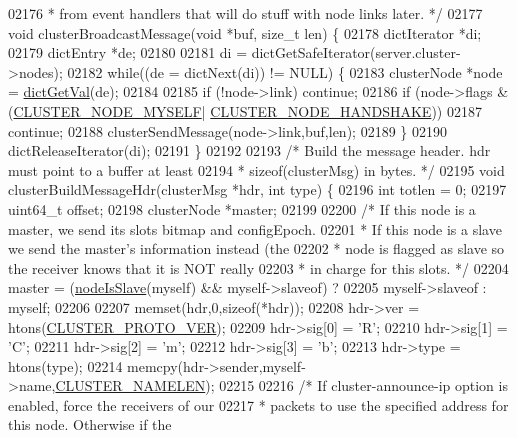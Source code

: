 \begin{DoxyCode}
{{{{{{{{{{{{{{{{{{{{{{{{{{{{{{{{{{{{{{02176 \textcolor{comment}{ * from event handlers that will do stuff with node links later. */}
02177 \textcolor{keywordtype}{void} clusterBroadcastMessage(\textcolor{keywordtype}{void} *buf, size\_t len) \{
02178     dictIterator *di;
02179     dictEntry *de;
02180 
02181     di = dictGetSafeIterator(server.cluster->nodes);
02182     \textcolor{keywordflow}{while}((de = dictNext(di)) != NULL) \{
02183         clusterNode *node = \hyperlink{dict_8h_ae8d2cc391873b2bea2b87c4f80f43120}{dictGetVal}(de);
02184 
02185         \textcolor{keywordflow}{if} (!node->link) \textcolor{keywordflow}{continue};
02186         \textcolor{keywordflow}{if} (node->flags & (\hyperlink{cluster_8h_afee946c4e74c08465e9b4ead5e3659e6}{CLUSTER\_NODE\_MYSELF}|
      \hyperlink{cluster_8h_a60571342a067f1e5772a04b36feff6a6}{CLUSTER\_NODE\_HANDSHAKE}))
02187             \textcolor{keywordflow}{continue};
02188         clusterSendMessage(node->link,buf,len);
02189     \}
02190     dictReleaseIterator(di);
02191 \}
02192 
02193 \textcolor{comment}{/* Build the message header. hdr must point to a buffer at least}
02194 \textcolor{comment}{ * sizeof(clusterMsg) in bytes. */}
02195 \textcolor{keywordtype}{void} clusterBuildMessageHdr(clusterMsg *hdr, \textcolor{keywordtype}{int} type) \{
02196     \textcolor{keywordtype}{int} totlen = 0;
02197     uint64\_t offset;
02198     clusterNode *master;
02199 
02200     \textcolor{comment}{/* If this node is a master, we send its slots bitmap and configEpoch.}
02201 \textcolor{comment}{     * If this node is a slave we send the master's information instead (the}
02202 \textcolor{comment}{     * node is flagged as slave so the receiver knows that it is NOT really}
02203 \textcolor{comment}{     * in charge for this slots. */}
02204     master = (\hyperlink{cluster_8h_a3c99881f6892130c902b42b1f84a0e11}{nodeIsSlave}(myself) && myself->slaveof) ?
02205               myself->slaveof : myself;
02206 
02207     memset(hdr,0,\textcolor{keyword}{sizeof}(*hdr));
02208     hdr->ver = htons(\hyperlink{cluster_8h_ad93688d5eca033b109b1a00bfb03cebe}{CLUSTER\_PROTO\_VER});
02209     hdr->sig[0] = \textcolor{stringliteral}{'R'};
02210     hdr->sig[1] = \textcolor{stringliteral}{'C'};
02211     hdr->sig[2] = \textcolor{stringliteral}{'m'};
02212     hdr->sig[3] = \textcolor{stringliteral}{'b'};
02213     hdr->type = htons(type);
02214     memcpy(hdr->sender,myself->name,\hyperlink{cluster_8h_ace7a882972eff7149675252938643b6e}{CLUSTER\_NAMELEN});
02215 
02216     \textcolor{comment}{/* If cluster-announce-ip option is enabled, force the receivers of our}
02217 \textcolor{comment}{     * packets to use the specified address for this node. Otherwise if the}
}}}}}}}}}}}}}}}}}}}}}}}}}}}}}}}}}}}}}}
\end{DoxyCode}
